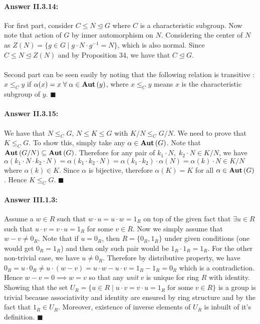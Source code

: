 \documentclass{article}
\theoremstyle{definition}
\theoremstyle{remark}
\theoremstyle{definition}
\theoremstyle{definition}
\newenvironment{customproof}[1]{\paragraph{Answer #1:}}{\hfill\ensuremath{\blacksquare}}
\newcommand{\inv}[1]{#1^{-1}}
\newcommand{\nsg}[0]{\trianglelefteq}
\newcommand{\Auto}[1]{\text{\textbf{Aut}}\left(#1\right)}
\begin{document}
\hrulefill
\begin{customproof}{II.3.14}
	For first part, consider $ C\le N\nsg G $ where $ C $ is a characteristic subgroup. Now note that action of $ G $ by inner automorphism on $ N $. Considering the center of $ N $ as $ Z(N) = \{g\in G\;\vert\;g\cdot N\cdot \inv{g}=N\}$, which is also normal. Since $ C\le N\nsg Z(N) $ and by Proposition 34, we have that $ C\nsg G $.\\\\
	Second part can be seen easily by noting that the following relation is transitive : $ x \le_C y $ if $ \alpha(x) = x \;\forall\;\alpha \in \Auto{y}$, where $ x\le_C y$ means $ x $ is the characteristic subgroup of $ y $. 
\end{customproof}

\hrulefill
\begin{customproof}{II.3.15}
	We have that $ N\le_C G$, $ N\le K\le G $ with $ K/N \le_C G/N $. We need to prove that $ K\le_C G $. To show this, simply take any $ \alpha \in \Auto{G} $. Note that $ \Auto{G/N} \subseteq \Auto{G} $. Therefore for any pair of $ k_1\cdot N, \;k_2\cdot N\in K/N $, we have $ \alpha(k_1\cdot N\cdot k_2\cdot N) = \alpha(k_1\cdot k_2\cdot N)= \alpha(k_1\cdot k_2)\cdot \alpha(N)  = \alpha(k)\cdot N \in K/N$ where $ \alpha(k)\in K $. Since $ \alpha $ is bijective, therefore $ \alpha(K) = K $ for all $ \alpha\in \Auto{G} $. Hence $ K\le_C G $.
\end{customproof}

\hrulefill
\begin{customproof}{III.1.3}
	Assume a $ w \in R $ such that $ w\cdot u = u\cdot w = 1_R $ on top of the given fact that $ \exists u\in R $ such that $ u\cdot v = v\cdot u = 1_R $ for some $ v\in R $. Now we simply assume that $ w-v\neq 0_R $. Note that if $ u= 0_R $, then $ R = \{0_R,1_R\} $ under given conditions (one would get $ 0_R = 1_R $) and then only such pair would be $ 1_R\cdot 1_R = 1_R$. For the other non-trivial case, we have $ u \neq 0_R  $. Therefore by distributive property, we have $ 0_R=u\cdot 0_R \neq u\cdot (w-v) = u\cdot w - u\cdot v = 1_R - 1_R = 0_R $ which is a contradiction. Hence $ w-v = 0 \implies w=v$ so that any \textit{unit} $ v $ is unique for ring $ R $ with identity. \\
	Showing that the set $ U_R = \{u\in R\;\vert\; u\cdot v=v\cdot u = 1_R\;\text{for some}\;v\in R\} $ is a group is trivial because associativity and identity are ensured by ring structure and by the fact that $ 1_R\in U_R $. Moreover, existence of inverse elements of $ U_R $ is inbuilt of it's definition. 
\end{customproof}
\end{document}
